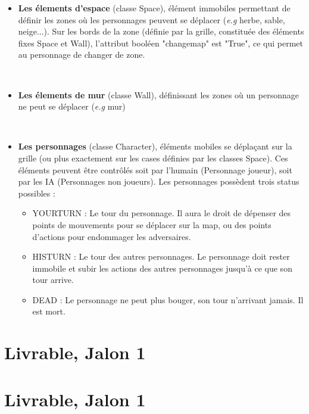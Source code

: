 \documentclass[12pt,a4paper]{report}
\begin{document}
\begin{itemize}
    

    \item  \textbf{Les élements d'espace} (classe Space), élément immobiles permettant de définir les zones où les personnages peuvent se déplacer (\textit{e.g} herbe, sable, neige...). Sur les bords de la zone (définie par la grille, constituée des éléments fixes Space et Wall), l'attribut booléen "changemap" est "True", ce qui permet au personnage de changer de zone.
   \par\leavevmode\

    \item  \textbf{Les élements de mur} (classe Wall), définissant les zones où un personnage ne peut se déplacer (\textit{e.g}  mur)
    
         
\par\leavevmode\
    \item \textbf{Les personnages} (classe Character), éléments mobiles se déplaçant sur la grille (ou plus exactement sur les cases définies par les classes Space). Ces éléments peuvent être contrôlés soit par l'humain (Personnage joueur), soit par les IA (Personnages non joueurs). Les personnages possèdent trois status possibles :
    \begin{itemize}
    
    \item YOURTURN : Le tour du personnage. Il aura le droit de dépenser des points de mouvements pour se déplacer sur la map, ou des points d'actions pour endommager les adversaires.
    \item HISTURN : Le tour des autres personnages. Le personnage doit rester immobile et subir les actions des autres personnages jusqu'à ce que son tour arrive.
    \item  DEAD : Le personnage ne peut plus bouger, son tour n'arrivant jamais. Il est mort.
    \end{itemize}
    
    \end{itemize}
    
    	\section{Livrable, Jalon 1}
    
	\section{Livrable, Jalon 1}
    
\end{document}
